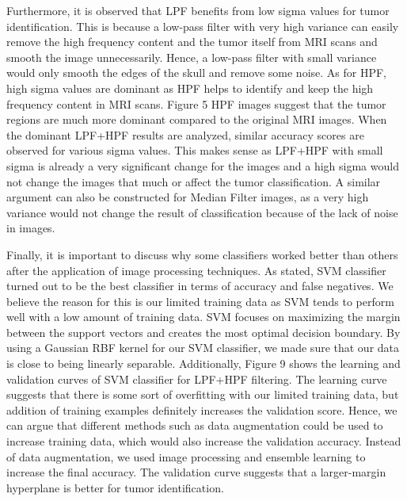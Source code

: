 \documentclass[conference]{IEEEtran}
\begin{document}
Furthermore, it is observed that LPF benefits from low sigma values for tumor identification. This is because a low-pass filter with very high variance can easily remove the high frequency content and the tumor itself from MRI scans and smooth the image unnecessarily. Hence, a low-pass filter with small variance would only smooth the edges of the skull and remove some noise. As for HPF, high sigma values are dominant as HPF helps to identify and keep the high frequency content in MRI scans. Figure 5 HPF images suggest that the tumor regions are much more dominant compared to the original MRI images. When the dominant LPF+HPF results are analyzed, similar accuracy scores are observed for various sigma values. This makes sense as LPF+HPF with small sigma is already a very significant change for the images and a high sigma would not change the images that much or affect the tumor classification. A similar argument can also be constructed for Median Filter images, as a very high variance would not change the result of classification because of the lack of noise in images. 

Finally, it is important to discuss why some classifiers worked better than others after the application of image processing techniques. As stated, SVM classifier turned out to be the best classifier in terms of accuracy and false negatives. We believe the reason for this is our limited training data as SVM tends to perform well with a low amount of training data. SVM focuses on maximizing the margin between the support vectors and creates the most optimal decision boundary. By using a Gaussian RBF kernel for our SVM classifier, we made sure that our data is close to being linearly separable. Additionally, Figure 9 shows the learning and validation curves of SVM classifier for LPF+HPF filtering. The learning curve suggests that there is some sort of overfitting with our limited training data, but addition of training examples definitely increases the validation score. Hence, we can argue that different methods such as data augmentation could be used to increase training data, which would also increase the validation accuracy. Instead of data augmentation, we used image processing and ensemble learning to increase the final accuracy. The validation curve suggests that a larger-margin hyperplane is better for tumor identification. 
\end{document}
